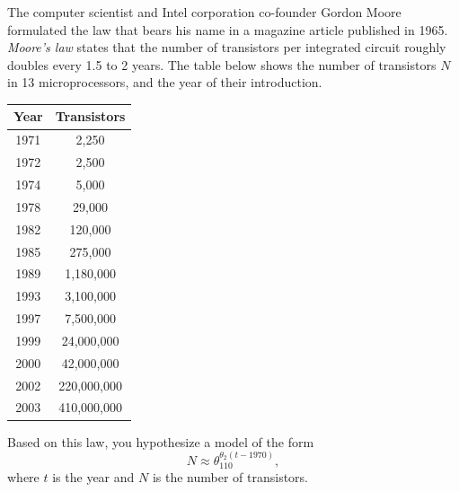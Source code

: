 \documentclass[answers,10pt]{exam}
\begin{document}
\begin{questions}
\question [10] The computer scientist and Intel corporation co-founder Gordon Moore formulated the law that bears his name in a magazine article published in 1965. {\em Moore's law} states that the number of transistors per integrated circuit roughly doubles every 1.5 to 2 years. The table below shows the number of transistors $N$ in 13 microprocessors, and the year of their introduction.

\begin{center}
\begin{tabular}{c|c}
Year & Transistors \\ \hline 
1971 & 2,250\\ 
1972 & 2,500 \\ 
1974 & 5,000\\ 
1978 & 29,000\\ 
1982 & 120,000\\ 
1985 & 275,000\\ 
1989 & 1,180,000\\ 
1993 & 3,100,000\\ 
1997 & 7,500,000\\ 
1999 & 24,000,000\\ 
2000 & 42,000,000\\ 
2002 & 220,000,000\\ 
2003 & 410,000,000\\ 
\end{tabular}
\end{center}
  Based on this law, you hypothesize a model of the form
\[ N \approx \theta_110^{\theta_2(t-1970)},\]
where $t$ is the year and $N$ is the number of transistors.  

\begin{parts}

\end{parts}
\end{questions}
\end{document}
